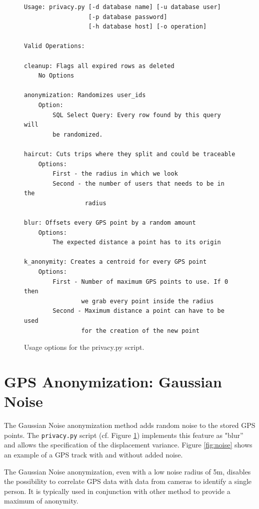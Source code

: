 \begin{figure}[fontsize=\tiny]
\centering
\begin{verbatim}
Usage: privacy.py [-d database name] [-u database user]
                  [-p database password]
                  [-h database host] [-o operation]

Valid Operations:

cleanup: Flags all expired rows as deleted
    No Options

anonymization: Randomizes user_ids
    Option:
        SQL Select Query: Every row found by this query will
        be randomized.

haircut: Cuts trips where they split and could be traceable
    Options:
        First - the radius in which we look
        Second - the number of users that needs to be in the
                 radius

blur: Offsets every GPS point by a random amount
    Options:
        The expected distance a point has to its origin

k_anonymity: Creates a centroid for every GPS point
    Options:
        First - Number of maximum GPS points to use. If 0 then
                we grab every point inside the radius
        Second - Maximum distance a point can have to be used
                for the creation of the new point
\end{verbatim}
\caption{Usage options for the privacy.py script.}
\label{fig:privacypy}
\end{figure}

\section{GPS Anonymization: Gaussian Noise}

The Gaussian Noise anonymization method adds random noise to the
stored GPS points. The \texttt{privacy.py} script (cf. Figure
\ref{fig:privacypy}) implements this feature as "blur'' and allows the
specification of the displacement variance.  Figure \ref{fig:noise}
shows an example of a GPS track with and without added noise.

The Gaussian Noise anonymization, even with a low noise radius of 5m,
disables the possibility to correlate GPS data with data from cameras
to identify a single person. It is typically used in conjunction with
other method to provide a maximum of anonymity.

